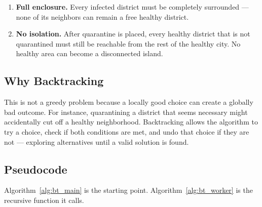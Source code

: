 \documentclass[conference]{IEEEtran}
\begin{document}
\begin{enumerate}
  \item \textbf{Full enclosure.} Every infected district must be
        completely surrounded — none of its neighbors can remain
        a free healthy district.
  \item \textbf{No isolation.} After quarantine is placed, every
        healthy district that is not quarantined must still be
        reachable from the rest of the healthy city. No healthy
        area can become a disconnected island.
\end{enumerate}

\subsection{Why Backtracking}

This is not a greedy problem because a locally good choice can create a
globally bad outcome. For instance, quarantining a district that seems necessary might accidentally cut off a healthy neighborhood. Backtracking allows the algorithm to try a choice, check if both conditions are met, and undo that choice if they are not — exploring alternatives until a valid solution is found.

\subsection{Pseudocode}

Algorithm~\ref{alg:bt_main} is the starting point.
Algorithm~\ref{alg:bt_worker} is the recursive function it calls.
\end{document}

